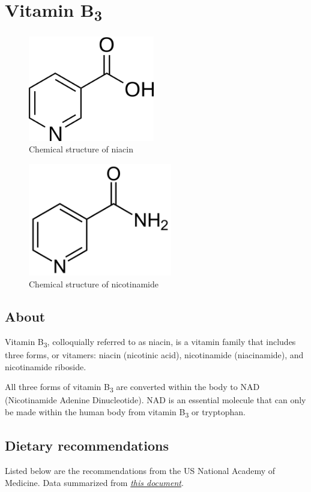 \documentclass{book}
\begin{document}
\chapter{Vitamin B\textsubscript{3}}
\begin{figure}[h]
	\caption{Chemical structure of niacin}
	\centering \includegraphics[width=0.49\textwidth]{images/Vitamin_B3_chemical_structure_niacin}
\end{figure}
\begin{figure}[h]
	\caption{Chemical structure of nicotinamide}
	\centering \includegraphics[width=0.56\textwidth]{images/Vitamin_B3_chemical_structure_nicotinamide}
\end{figure}
\newpage

\section{About}
Vitamin B\textsubscript{3}, colloquially referred to as niacin, is a vitamin family that includes three forms, or vitamers: niacin (nicotinic acid), nicotinamide (niacinamide), and nicotinamide riboside.

All three forms of vitamin B\textsubscript{3} are converted within the body to NAD (Nicotinamide Adenine Dinucleotide). NAD is an essential molecule that can only be made within the human body from vitamin B\textsubscript{3} or tryptophan.

\section{Dietary recommendations}
Listed below are the recommendations from the US National Academy of Medicine. Data summarized from \href{https://nap.nationalacademies.org/read/6015/chapter/8}{\textit{this document}}.
\end{document}
